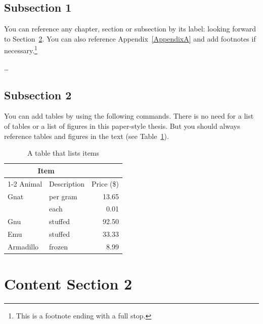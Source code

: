 \section{Subsection 1}
\label{ch:section1:sec:subsection1}

You can reference any chapter, section or subsection by its label: looking forward to Section~\ref{ch:section1:sec:subsection2}. You can also reference Appendix~\ref{AppendixA} and add footnotes if necessary.\footnote{This is a footnote ending with a full stop.} 

\dots

\section{Subsection 2}
\label{ch:section1:sec:subsection2}



You can add tables by using the following commands. There is no need for a list of tables or a list of figures in this paper-style thesis. But you should always reference tables and figures in the text (see Table~\ref{tab:prices}). 
\begin{table}[htb]%
	\centering
	\begin{tabular}{llr}
		\toprule
		\multicolumn{2}{c}{Item} \\
		\cmidrule(r){1-2}
		Animal    & Description & Price (\$) \\
		\midrule
		Gnat      & per gram    & 13.65      \\
		& each        & 0.01       \\
		Gnu       & stuffed     & 92.50      \\
		Emu       & stuffed     & 33.33      \\
		Armadillo & frozen      & 8.99       \\
		\bottomrule
	\end{tabular}
	\caption{A table that lists items \citep[based on][]{Becker2009}}
	\label{tab:prices}
\end{table}


\chapter{Content Section 2}
\label{ch:section2}

